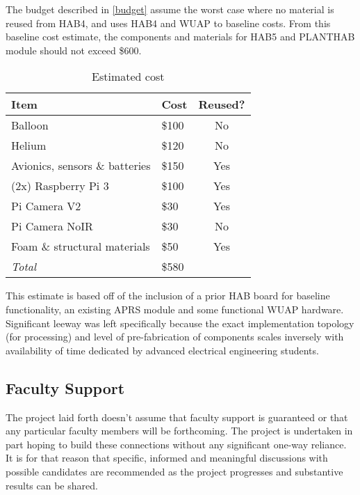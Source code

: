 \documentclass[conference]{IEEEtran} %
\begin{document}
The budget described in \autoref{budget} assume the worst case where no material is reused from HAB4, and uses HAB4 and WUAP to baseline costs.
From this baseline cost estimate, the components and materials for HAB5 and PLANTHAB module should not exceed \$600.

\begin{table}[ht]
  \caption{Estimated cost}
  \centering
  \begin{tabular}{@{}llc@{}}
    \label{budget}
    \textbf{Item} & \textbf{Cost} & \textbf{Reused?} \\
    \midrule
    Balloon & \$100 & No \\
    Helium & \$120 & No\\
    Avionics, sensors \& batteries & \$150 & Yes\\
    (2x) Raspberry Pi 3 & \$100 & Yes\\
    Pi Camera V2 & \$30 & Yes \\
    Pi Camera NoIR & \$30 & No \\
    Foam \& structural materials & \$50 & Yes \\
    \midrule
    \textit{Total} & \$580 & \\
  \end{tabular}
\end{table} 

This estimate is based off of the inclusion of a prior HAB board for baseline functionality, an existing APRS module and some functional WUAP hardware. 
Significant leeway was left specifically because the exact implementation topology (for processing) and level of pre-fabrication of components scales inversely with availability of time dedicated by advanced electrical engineering students.

\subsection{Faculty Support}
The project laid forth doesn't assume that faculty support is guaranteed or that any particular faculty members will be forthcoming. 
The project is undertaken in part hoping to build these connections without any significant one-way reliance. 
It is for that reason that specific, informed and meaningful discussions with possible candidates are recommended as the project progresses and substantive results can be shared.
\end{document}

